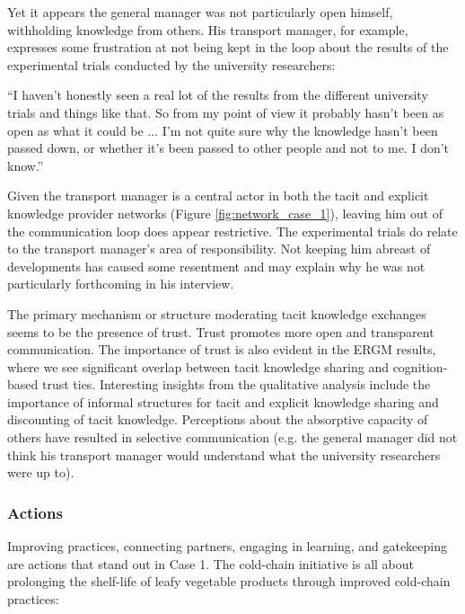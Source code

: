 Yet it appears the general manager was not particularly open himself, withholding knowledge from others. His transport manager, for example, expresses some frustration at not being kept in the loop about the results of the experimental trials conducted by the university researchers:

\begin{displayquote}[Participant 3/1]
\small
\enquote{I haven't honestly seen a real lot of the results from the different university trials and things like that. So from my point of view it probably hasn't been as open as what it could be ... I'm not quite sure why the knowledge hasn't been passed down, or whether it's been passed to other people and not to me. I don't know.} 
\end{displayquote}
 

Given the transport manager is a central actor in both the tacit and explicit knowledge provider networks (Figure \ref{fig:network_case_1}), leaving him out of the communication loop does appear restrictive. The experimental trials do relate to the transport manager's area of responsibility. Not keeping him abreast of developments has caused some resentment and may explain why he was not particularly forthcoming in his interview. \medskip

The primary mechanism or structure moderating tacit knowledge exchanges seems to be the presence of trust. Trust promotes more open and transparent communication. The importance of trust is also evident in the ERGM results, where we see significant overlap between tacit knowledge sharing and cognition-based trust ties. Interesting insights from the qualitative analysis include the importance of informal structures for tacit and explicit knowledge sharing and discounting of tacit knowledge. Perceptions about the absorptive capacity of others have resulted in selective communication (e.g. the general manager did not think his transport manager would understand what the university researchers were up to).

\subsubsection{Actions}

Improving practices, connecting partners, engaging in learning, and gatekeeping are actions that stand out in Case 1. The cold-chain initiative is all about prolonging the shelf-life of leafy vegetable products through improved cold-chain practices:

